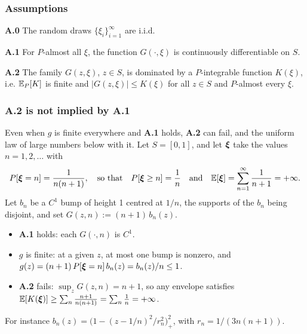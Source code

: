 \documentclass[aspectratio=169]{beamer}
\begin{document}
\begin{frame}
\frametitle{Assumptions}

\noindent
\textbf{A.0}
The random draws $\lbrace \xi_i \rbrace_{i = 1}^{\infty}$ are i.i.d.

\mbox{}

\noindent
\textbf{A.1}
For $P$-almost all $\xi$, the function $G(\cdot, \xi)$ is continuously differentiable on $S$.

\mbox{}

\noindent
\textbf{A.2}
The family $G(z, \xi)$, $z \in S$, is dominated by a $P$-integrable function $K(\xi)$, i.e. ${\mathbb{E}}_P[K]$ is finite and $| G(z, \xi) | \leq K(\xi)$ for all $z \in S$ and $P$-almost every $\xi$.

\end{frame}

\begin{frame}
\frametitle{\textbf{A.2} is not implied by \textbf{A.1}}

Even when $g$ is finite everywhere and \textbf{A.1} holds, \textbf{A.2} can fail, and the uniform law of large numbers below with it.
Let $S = [0,1]$, and let ${\boldsymbol{\xi}}$ take the values $n = 1, 2, \ldots$ with
\[
P[{\boldsymbol{\xi}} = n] = \frac{1}{n(n+1)}, \quad \text{so that} \quad P[{\boldsymbol{\xi}} \geq n] = \frac{1}{n} \quad \text{and} \quad {\mathbb{E}}[{\boldsymbol{\xi}}] = \sum_{n=1}^{\infty} \frac{1}{n+1} = +\infty.
\]
Let $b_n$ be a $C^1$ bump of height 1 centred at $1/n$, the supports of the $b_n$ being disjoint, and set
$
G(z, n) := (n+1)\, b_n(z).
$
\begin{itemize}
\item
\textbf{A.1} holds: each $G(\cdot, n)$ is $C^1$.
\item
$g$ is finite: at a given $z$, at most one bump is nonzero, and $g(z) = (n+1)\, P[{\boldsymbol{\xi}} = n]\, b_n(z) = b_n(z)/n \leq 1$.
\item
\textbf{A.2} fails: $\sup_z G(z,n) = n+1$, so any envelope satisfies ${\mathbb{E}}[K({\boldsymbol{\xi}})] \geq \sum_n \frac{n+1}{n(n+1)} = \sum_n \frac{1}{n} = +\infty$.
\end{itemize}

{\footnotesize For instance $b_n(z) = \big(1 - (z - 1/n)^2/r_n^2\big)_+^2$, with $r_n = 1/(3n(n+1))$.}

\end{frame}
\end{document}
